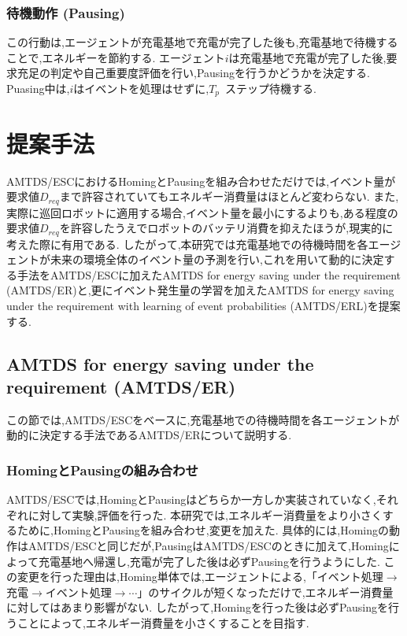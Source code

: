 \documentclass[12pt,a4j,twoside]{jarticle}
\begin{document}
  \subsubsection{待機動作 (Pausing)}
  この行動は,エージェントが充電基地で充電が完了した後も,充電基地で待機することで,エネルギーを節約する.
  エージェント$i$は充電基地で充電が完了した後,要求充足の判定や自己重要度評価を行い,Pausingを行うかどうかを決定する.
  Puasing中は,$i$はイベントを処理はせずに,$T_p$~ステップ待機する.

  \section{提案手法}
  AMTDS/ESCにおけるHomingとPausingを組み合わせただけでは,イベント量が要求値$D_{req}$まで許容されていてもエネルギー消費量はほとんど変わらない.
  また,実際に巡回ロボットに適用する場合,イベント量を最小にするよりも,ある程度の要求値$D_{req}$を許容したうえでロボットのバッテリ消費を抑えたほうが,現実的に考えた際に有用である.
  したがって,本研究では充電基地での待機時間を各エージェントが未来の環境全体のイベント量の予測を行い,これを用いて動的に決定する手法をAMTDS/ESCに加えたAMTDS for energy saving under the requirement (AMTDS/ER)と,更にイベント発生量の学習を加えたAMTDS for energy saving under the requirement with learning of event probabilities (AMTDS/ERL)を提案する.

  \subsection{AMTDS for energy saving under the requirement (AMTDS/ER)}
  この節では,AMTDS/ESCをベースに,充電基地での待機時間を各エージェントが動的に決定する手法であるAMTDS/ERについて説明する.

  \subsubsection{HomingとPausingの組み合わせ}
  AMTDS/ESCでは,HomingとPausingはどちらか一方しか実装されていなく,それぞれに対して実験,評価を行った. 
  本研究では,エネルギー消費量をより小さくするために,HomingとPausingを組み合わせ,変更を加えた.
  具体的には,Homingの動作はAMTDS/ESCと同じだが,PausingはAMTDS/ESCのときに加えて,Homingによって充電基地へ帰還し,充電が完了した後は必ずPausingを行うようにした.
  この変更を行った理由は,Homing単体では,エージェントによる,「イベント処理$\rightarrow$充電$\rightarrow$イベント処理$\rightarrow \dotsm$」のサイクルが短くなっただけで,エネルギー消費量に対してはあまり影響がない.
  したがって,Homingを行った後は必ずPausingを行うことによって,エネルギー消費量を小さくすることを目指す.
  
\end{document}
